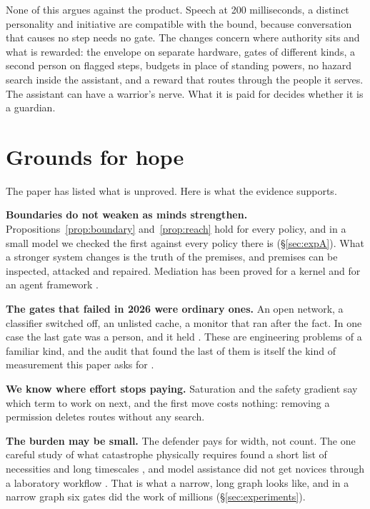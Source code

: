 \documentclass[10pt,twocolumn]{article}
\theoremstyle{plain}
\theoremstyle{definition}
\newcommand{\para}[1]{\smallskip\noindent\textbf{#1}\enspace}
\begin{document}
None of this argues against the product. Speech at 200 milliseconds, a distinct personality
and initiative are compatible with the bound, because conversation that causes no step needs
no gate. The changes concern where authority sits and what is rewarded: the envelope on
separate hardware, gates of different kinds, a second person on flagged steps, budgets in
place of standing powers, no hazard search inside the assistant, and a reward that routes
through the people it serves. The assistant can have a warrior's nerve. What it is paid for
decides whether it is a guardian.

\section{Grounds for hope}\label{sec:hope}

The paper has listed what is unproved. Here is what the evidence supports.

\para{Boundaries do not weaken as minds strengthen.} Propositions~\ref{prop:boundary}
and~\ref{prop:reach} hold for every policy, and in a small model we checked the first against
every policy there is (\S\ref{sec:expA}). What a stronger system changes is the truth of the
premises, and premises can be inspected, attacked and repaired. Mediation has been proved for
a kernel and for an agent framework \cite{klein2009,moon2026}.

\para{The gates that failed in 2026 were ordinary ones.} An open network, a classifier
switched off, an unlisted cache, a monitor that ran after the fact. In one case the last gate
was a person, and it held \cite{anthropic2026aisi}. These are engineering problems of a
familiar kind, and the audit that found the last of them is itself the kind of measurement
this paper asks for \cite{metr2026audit}.

\para{We know where effort stops paying.} Saturation and the safety gradient say which term
to work on next, and the first move costs nothing: removing a permission deletes routes
without any search.

\para{The burden may be small.} The defender pays for width, not count. The one careful study
of what catastrophe physically requires found a short list of necessities and long timescales
\cite{vermeer2025}, and model assistance did not get novices through a laboratory workflow
\cite{hong2026}. That is what a narrow, long graph looks like, and in a narrow graph six
gates did the work of millions (\S\ref{sec:experiments}).
\end{document}
